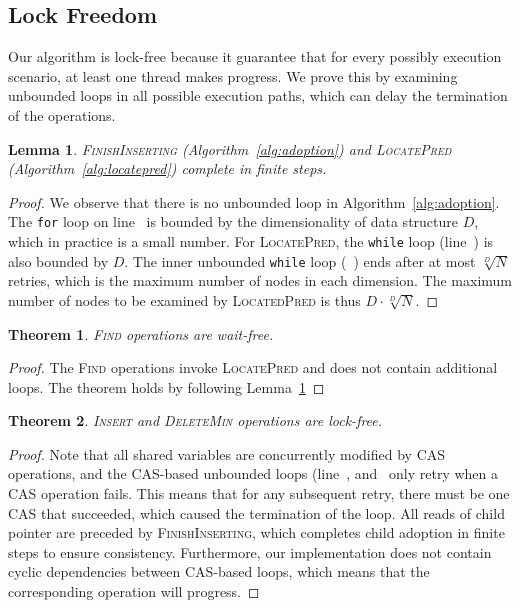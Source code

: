 \documentclass[10pt,conference,compsocconf]{IEEEtran}
\newtheorem{theorem}{Theorem}
\newtheorem{lemma}{Lemma}
\begin{document}
\subsection{Lock Freedom}
Our algorithm is lock-free because it guarantee that for every possibly execution scenario, at least one thread makes progress.
We prove this by examining unbounded loops in all possible execution paths, which can delay the termination of the operations.
\begin{lemma} \label{lmm:finitestep}
    \textsc{FinishInserting} (Algorithm~\ref{alg:adoption}) and \textsc{LocatePred} (Algorithm~\ref{alg:locatepred}) complete in finite steps.
\end{lemma}
\begin{proof}
    We observe that there is no unbounded loop in Algorithm~\ref{alg:adoption}.
    The \texttt{for} loop on line~ is bounded by the dimensionality of data structure $D$, which in practice is a small number.
    For \textsc{LocatePred}, the \texttt{while} loop (line~) is also bounded by $D$.
    The inner unbounded \texttt{while} loop (~) ends after at most $\sqrt[D]{N}$ retries, which is the maximum number of nodes in each dimension.
    The maximum number of nodes to be examined by \textsc{LocatedPred} is thus $D \cdot \sqrt[D]{N}$.
\end{proof}

\begin{theorem}
    \textsc{Find} operations are wait-free.
\end{theorem}
\begin{proof}
    The \textsc{Find} operations invoke \textsc{LocatePred} and does not contain additional loops. 
    The theorem holds by following Lemma~\ref{lmm:finitestep} 
\end{proof}

\begin{theorem}
    \textsc{Insert} and \textsc{DeleteMin} operations are lock-free.
\end{theorem}
\begin{proof}
    Note that all shared variables are concurrently modified by CAS operations, and the CAS-based unbounded loops (line~, and~ only retry when a CAS operation fails.
    This means that for any subsequent retry, there must be one CAS that succeeded, which caused the termination of the loop.
    All reads of child pointer are preceded by \textsc{FinishInserting}, which completes child adoption in finite steps to ensure consistency.
    Furthermore, our implementation does not contain cyclic dependencies between CAS-based loops, which means that the corresponding operation will progress.
\end{proof}
\end{document}
